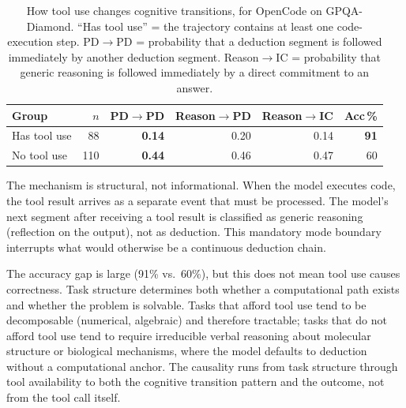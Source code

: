 \begin{table}[t]
\centering
\small
\caption{%
  How tool use changes cognitive transitions, for OpenCode on GPQA-Diamond.
  ``Has tool use'' = the trajectory contains at least one code-execution step.
  PD$\to$PD = probability that a deduction segment is followed immediately
  by another deduction segment.
  Reason$\to$IC = probability that generic reasoning is followed immediately
  by a direct commitment to an answer.
}
\label{tab:arm-tool-catalyst}
\setlength{\tabcolsep}{4pt}
\begin{tabular}{lrrrrr}
\toprule
Group & $n$ & PD$\to$PD & Reason$\to$PD & Reason$\to$IC & Acc\,\% \\
\midrule
Has tool use    &  88 & \textbf{0.14} & 0.20 & 0.14 & \textbf{91} \\
No tool use     & 110 & \textbf{0.44} & 0.46 & 0.47 & 60 \\
\bottomrule
\end{tabular}
\end{table}


The mechanism is structural, not informational.
When the model executes code, the tool result arrives as a separate event
that must be processed.
The model's next segment after receiving a tool result is classified as
generic reasoning (reflection on the output), not as deduction.
This mandatory mode boundary interrupts what would otherwise be a continuous
deduction chain.

The accuracy gap is large (91\% vs.\ 60\%), but this does not mean tool use
causes correctness.
Task structure determines both whether a computational path exists and
whether the problem is solvable.
Tasks that afford tool use tend to be decomposable (numerical, algebraic)
and therefore tractable; tasks that do not afford tool use tend to require
irreducible verbal reasoning about molecular structure or biological
mechanisms, where the model defaults to deduction without a computational
anchor.
The causality runs from task structure through tool availability to both the
cognitive transition pattern and the outcome, not from the tool call itself.


